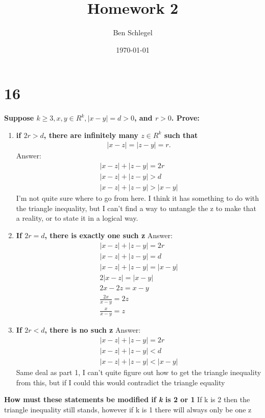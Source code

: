 \documentclass{article}
\author{Ben Schlegel
}
\title{Homework 2}
\date{\today}
\begin{document}
\maketitle
\section* {16} 
\noindent \textbf{Suppose $k \ge 3, x, y \in R^k,|x-y| = d > 0 $, and $r > 0$. Prove:}
\begin{enumerate}[label=(\alph*)]
    \item \textbf{if $2r > d$, there are infinitely many $z \in R^k$ such that} \begin{align*}
        |x-z| = |z-y| = r.
    \end{align*}
    Answer:
    \begin{align*}
        |x-z| + |z-y| = 2r\\
        |x-z| + |z-y| > d\\
        |x-z| + |z-y| > |x-y|
    \end{align*}
    I'm not quite sure where to go from here. I think it has something to do with the triangle inequality, but I can't find a way to untangle the z to make that a reality, or to state it in a logical way.
    \item \textbf{If $2r = d$, there is exactly one such z}
    Answer:
    \begin{align*}
        |x-z| + |z-y| = 2r\\
        |x-z| + |z-y| = d\\
        |x-z| + |z-y| = |x-y|\\
        2|x-z| = |x-y|\\
        2x-2z = x-y\\
        \frac{2x}{x-y} = 2z\\
        \frac{x}{x-y} = z
    \end{align*}
    \item \textbf{If $2r < d$, there is no such z}
    Answer:
    \begin{align*}
        |x-z| + |z-y| = 2r\\
        |x-z| + |z-y| < d\\
        |x-z| + |z-y| < |x-y|
    \end{align*}
    Same deal as part 1, I can't quite figure out how to get the triangle inequality from this, but if I could this would contradict the triangle equality
\end{enumerate}
\textbf{How must these statements be modified if \emph{k} is 2 or 1}
If k is 2 then the triangle inequality still stands, however if k is 1 there will always only be one z
\end{document}
